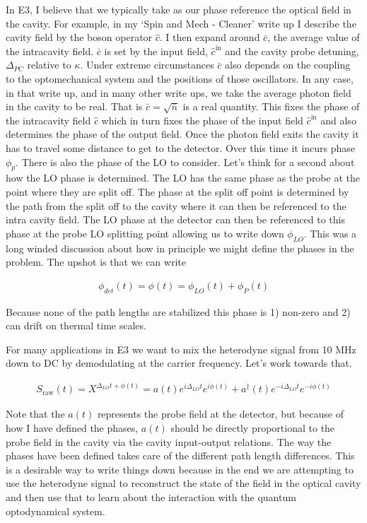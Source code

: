 \documentclass[12pt]{article}
\begin{document}
In E3, I believe that we typically take as our phase reference the optical field in the cavity. For example, in my `Spin and Mech - Cleaner' write up I describe the cavity field by the boson operator $\hat{c}$. I then expand around $\bar{c}$, the average value of the intracavity field. $\bar{c}$ is set by the input field, $\hat{c}^{\text{in}}$ and the cavity probe detuning, $\Delta_{PC}$ relative to $\kappa$. Under extreme circumstances $\bar{c}$ also depends on the coupling to the optomechanical system and the positions of those oscillators. In any case, in that write up, and in many other write ups, we take the average photon field in the cavity to be real. That is $\bar{c} = \sqrt{\bar{n}}$ is a real quantity. This fixes the phase of the intracavity field $\hat{c}$ which in turn fixes the phase of the input field $\hat{c}^{\text{in}}$ and also determines the phase of the output field.
Once the photon field exits the cavity it has to travel some distance to get to the detector. Over this time it incurs phase $\phi_{p}$. There is also the phase of the LO to consider. Let's think for a second about how the LO phase is determined. The LO has the same phase as the probe at the point where they are split off. The phase at the split off point is determined by the path from the split off to the cavity where it can then be referenced to the intra cavity field. The LO phase at the detector can then be referenced to this phase at the probe LO splitting point allowing us to write down $\phi_{LO}$. This was a long winded discussion about how in principle we might define the phases in the problem. The upshot is that we can write

\begin{align}
\phi_{det}(t) = \phi(t) = \phi_{LO}(t) + \phi_P(t)
\end{align}

Because none of the path lengths are stabilized this phase is 1) non-zero and 2) can drift on thermal time scales.

For many applications in E3 we want to mix the heterodyne signal from 10 MHz down to DC by demodulating at the carrier frequency. Let's work towards that.

\begin{align}
S_{\text{raw}}(t) = X^{\Delta_{LO} t + \phi(t)} = a(t) e^{i\Delta_{LO}t} e^{i\phi(t)} + a^{\dag}(t) e^{-i\Delta_{LO}t} e^{-i\phi(t)}
\end{align}

Note that the $a(t)$ represents the probe field at the detector, but because of how I have defined the phases, $a(t)$ should be directly proportional to the probe field in the cavity via the cavity input-output relations. The way the phases have been defined takes care of the different path length differences. This is a desirable way to write things down because in the end we are attempting to use the heterodyne signal to reconstruct the state of the field in the optical cavity and then use that to learn about the interaction with the quantum optodynamical system.
\end{document}
